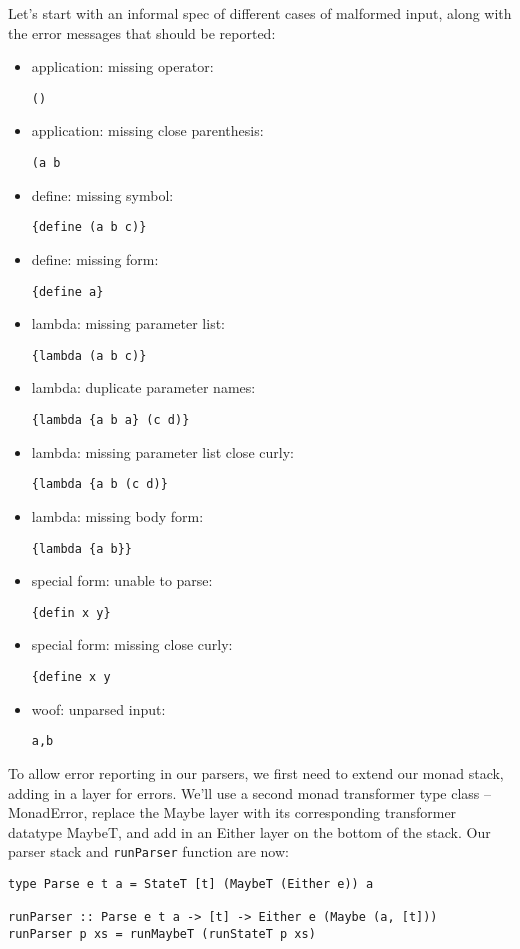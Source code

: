 \documentclass{tmr}
\begin{document}
Let's start with an informal spec of different cases of malformed input, along 
with the error messages that should be reported: 
\begin{itemize}
  \item application: missing operator:  \begin{verbatim}()\end{verbatim}
  \item application: missing close parenthesis:  \begin{verbatim}(a b\end{verbatim}
  \item define: missing symbol:  \begin{verbatim}{define (a b c)}\end{verbatim}
  \item define: missing form:  \begin{verbatim}{define a}\end{verbatim}
  \item lambda: missing parameter list:  \begin{verbatim}{lambda (a b c)}\end{verbatim}
  \item lambda: duplicate parameter names:  \begin{verbatim}{lambda {a b a} (c d)}\end{verbatim}
  \item lambda: missing parameter list close curly:  \begin{verbatim}{lambda {a b (c d)}\end{verbatim}
  \item lambda: missing body form:  \begin{verbatim}{lambda {a b}}\end{verbatim}
  \item special form: unable to parse:  \begin{verbatim}{defin x y}\end{verbatim}
  \item special form: missing close curly:  \begin{verbatim}{define x y\end{verbatim}
  \item woof: unparsed input:  \begin{verbatim}a,b\end{verbatim}
\end{itemize}

To allow error reporting in our parsers, we first need to extend our monad stack, 
adding in a layer for errors.  We'll use a second monad transformer type class 
-- MonadError, replace the Maybe layer with its corresponding transformer datatype 
MaybeT, and add in an Either layer on the bottom of the stack.  Our parser stack 
and \verb+runParser+ function are now:
\begin{verbatim}
type Parse e t a = StateT [t] (MaybeT (Either e)) a

runParser :: Parse e t a -> [t] -> Either e (Maybe (a, [t]))
runParser p xs = runMaybeT (runStateT p xs)
\end{verbatim}
\end{document}
